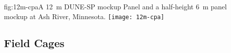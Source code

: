
\begin{dunefigure}{fig:12m-cpa}{A \SI{12}{\m} DUNE-SP  mockup Panel and a %
half-height \SI{6}{\m}  panel mockup at Ash River, Minnesota.}  %
\texttt{[image: 12m-cpa]}
\end{dunefigure}

\subsection{Field Cages}
\label{sec:fdsp-hv-prod-fc}

